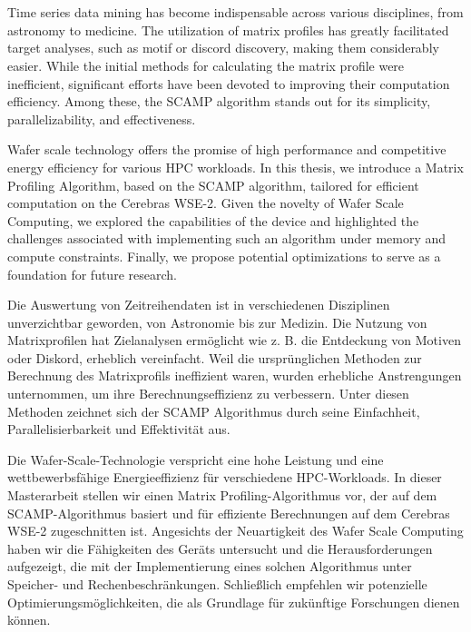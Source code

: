 \chapter{\abstractname}

Time series data mining has become indispensable across various disciplines, from astronomy to medicine. The utilization of matrix profiles has greatly facilitated target analyses, such as motif or discord discovery, making them considerably easier. While the initial methods for calculating the matrix profile were inefficient, significant efforts have been devoted to improving their computation efficiency. Among these, the SCAMP algorithm stands out for its simplicity, parallelizability, and effectiveness.

Wafer scale technology offers the promise of high performance and competitive energy efficiency for various HPC workloads. In this thesis, we introduce a Matrix Profiling Algorithm, based on the SCAMP algorithm, tailored for efficient computation on the Cerebras WSE-2. Given the novelty of Wafer Scale Computing, we explored the capabilities of the device and highlighted the challenges associated with implementing such an algorithm under memory and compute constraints. Finally, we propose potential optimizations to serve as a foundation for future research.
\newline

Die Auswertung von Zeitreihendaten ist in verschiedenen Disziplinen unverzichtbar geworden, von
Astronomie bis zur Medizin. Die Nutzung von Matrixprofilen hat Zielanalysen ermöglicht wie z. B. die Entdeckung von Motiven oder Diskord, erheblich vereinfacht. Weil die ursprünglichen Methoden zur Berechnung des Matrixprofils ineffizient waren, wurden erhebliche Anstrengungen unternommen, um ihre Berechnungseffizienz zu verbessern. Unter diesen Methoden zeichnet sich der SCAMP Algorithmus durch seine Einfachheit, Parallelisierbarkeit und Effektivität aus.

Die Wafer-Scale-Technologie verspricht eine hohe Leistung und eine wettbewerbsfähige
Energieeffizienz für verschiedene HPC-Workloads. In dieser Masterarbeit stellen wir einen Matrix
Profiling-Algorithmus vor, der auf dem SCAMP-Algorithmus basiert und für effiziente Berechnungen
auf dem Cerebras WSE-2 zugeschnitten ist. Angesichts der Neuartigkeit des Wafer Scale Computing haben wir die
Fähigkeiten des Geräts untersucht und die Herausforderungen aufgezeigt, die mit der Implementierung
eines solchen Algorithmus unter Speicher- und Rechenbeschränkungen. Schließlich empfehlen wir potenzielle
Optimierungsmöglichkeiten, die als Grundlage für zukünftige Forschungen dienen können.